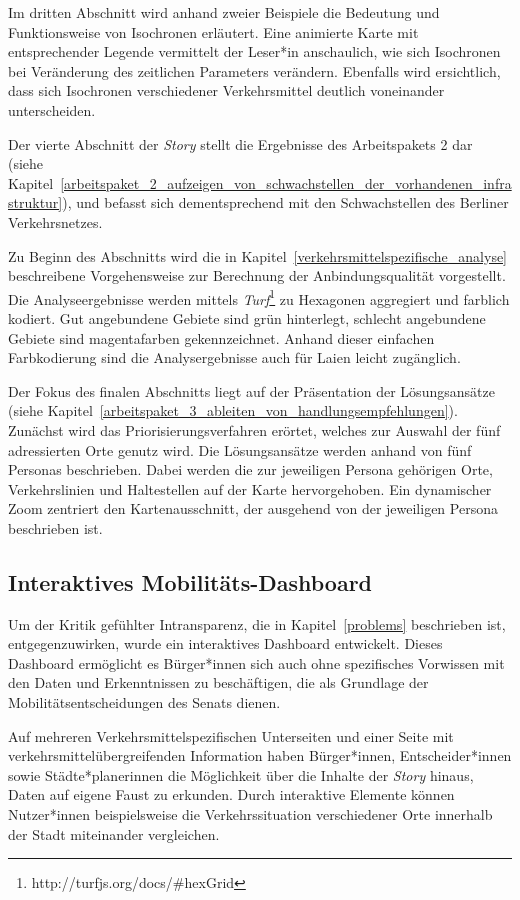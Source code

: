 Im dritten Abschnitt wird anhand zweier Beispiele die Bedeutung und Funktionsweise von Isochronen erläutert. Eine animierte Karte mit entsprechender Legende vermittelt der Leser*in anschaulich, wie sich Isochronen bei Veränderung des zeitlichen Parameters verändern. Ebenfalls wird ersichtlich, dass sich Isochronen verschiedener Verkehrsmittel deutlich voneinander unterscheiden.

Der vierte Abschnitt der \emph{Story} stellt die Ergebnisse des Arbeitspakets 2 dar (siehe Kapitel~\ref{arbeitspaket_2_aufzeigen_von_schwachstellen_der_vorhandenen_infrastruktur}), und befasst sich dementsprechend  mit den Schwachstellen des Berliner Verkehrsnetzes.

Zu Beginn des Abschnitts wird die in Kapitel~\ref{verkehrsmittelspezifische_analyse} beschreibene Vorgehensweise zur Berechnung der Anbindungsqualität vorgestellt. Die Analyseergebnisse werden mittels \emph{Turf}\footnote{http://turfjs.org/docs/\#hexGrid} zu Hexagonen aggregiert und farblich kodiert. Gut angebundene Gebiete sind  grün hinterlegt, schlecht angebundene Gebiete sind magentafarben gekennzeichnet. Anhand dieser einfachen Farbkodierung sind die Analysergebnisse auch für Laien leicht zugänglich.

Der Fokus des finalen Abschnitts liegt auf der Präsentation der Lösungsansätze (siehe Kapitel~\ref{arbeitspaket_3_ableiten_von_handlungsempfehlungen}). Zunächst wird das Priorisierungsverfahren erörtet, welches zur Auswahl der fünf adressierten Orte genutz wird. Die Lösungsansätze werden anhand von fünf Personas beschrieben. Dabei werden die zur jeweiligen Persona gehörigen Orte, Verkehrslinien und Haltestellen auf der Karte hervorgehoben. Ein dynamischer Zoom zentriert den Kartenausschnitt, der ausgehend von der jeweiligen Persona beschrieben ist.

\subsection{Interaktives Mobilitäts-Dashboard}
\label{interaktives_mobilitaets_dashboard}

Um der Kritik gefühlter Intransparenz, die in Kapitel~\ref{problems} beschrieben ist, entgegenzuwirken, wurde ein interaktives Dashboard entwickelt. Dieses Dashboard ermöglicht es Bürger*innen sich auch ohne spezifisches Vorwissen mit den Daten und Erkenntnissen zu beschäftigen, die als Grundlage der Mobilitätsentscheidungen des Senats dienen.

Auf mehreren Verkehrsmittelspezifischen Unterseiten und einer Seite mit verkehrsmittelübergreifenden Information haben Bürger*innen, Entscheider*innen sowie Städte*planerinnen die Möglichkeit über die Inhalte der \emph{Story} hinaus, Daten auf eigene Faust zu erkunden. Durch interaktive Elemente können Nutzer*innen beispielsweise die Verkehrssituation verschiedener Orte innerhalb der Stadt miteinander vergleichen.

